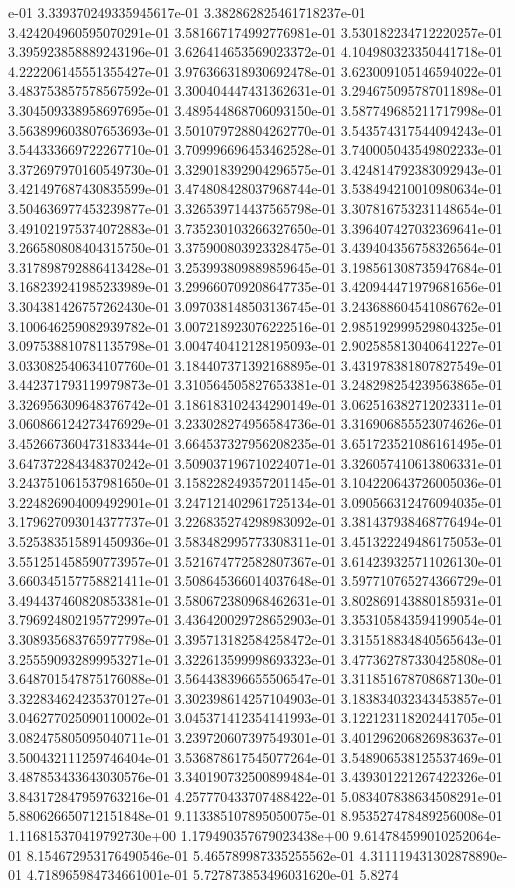e-01	3.339370249335945617e-01	3.382862825461718237e-01	3.424204960595070291e-01	3.581667174992776981e-01	3.530182234712220257e-01	3.395923858889243196e-01	3.626414653569023372e-01	4.104980323350441718e-01	4.222206145551355427e-01	3.976366318930692478e-01	3.623009105146594022e-01	3.483753857578567592e-01	3.300404447431362631e-01	3.294675095787011898e-01	3.304509338958697695e-01	3.489544868706093150e-01	3.587749685211717998e-01	3.563899603807653693e-01	3.501079728804262770e-01	3.543574317544094243e-01	3.544333669722267710e-01	3.709996696453462528e-01	3.740005043549802233e-01	3.372697970160549730e-01	3.329018392904296575e-01	3.424814792383092943e-01	3.421497687430835599e-01	3.474808428037968744e-01	3.538494210010980634e-01	3.504636977453239877e-01	3.326539714437565798e-01	3.307816753231148654e-01	3.491021975374072883e-01	3.735230103266327650e-01	3.396407427032369641e-01	3.266580808404315750e-01	3.375900803923328475e-01	3.439404356758326564e-01	3.317898792886413428e-01	3.253993809889859645e-01	3.198561308735947684e-01	3.168239241985233989e-01	3.299660709208647735e-01	3.420944471979681656e-01	3.304381426757262430e-01	3.097038148503136745e-01	3.243688604541086762e-01	3.100646259082939782e-01	3.007218923076222516e-01	2.985192999529804325e-01	3.097538810781135798e-01	3.004740412128195093e-01	2.902585813040641227e-01	3.033082540634107760e-01	3.184407371392168895e-01	3.431978381807827549e-01	3.442371793119979873e-01	3.310564505827653381e-01	3.248298254239563865e-01	3.326956309648376742e-01	3.186183102434290149e-01	3.062516382712023311e-01	3.060866124273476929e-01	3.233028274956584736e-01	3.316906855523074626e-01	3.452667360473183344e-01	3.664537327956208235e-01	3.651723521086161495e-01	3.647372284348370242e-01	3.509037196710224071e-01	3.326057410613806331e-01	3.243751061537981650e-01	3.158228249357201145e-01	3.104220643726005036e-01	3.224826904009492901e-01	3.247121402961725134e-01	3.090566312476094035e-01	3.179627093014377737e-01	3.226835274298983092e-01	3.381437938468776494e-01	3.525383515891450936e-01	3.583482995773308311e-01	3.451322249486175053e-01	3.551251458590773957e-01	3.521674772582807367e-01	3.614239325711026130e-01	3.660345157758821411e-01	3.508645366014037648e-01	3.597710765274366729e-01	3.494437460820853381e-01	3.580672380968462631e-01	3.802869143880185931e-01	3.796924802195772997e-01	3.436420029728652903e-01	3.353105843594199054e-01	3.308935683765977798e-01	3.395713182584258472e-01	3.315518834840565643e-01	3.255590932899953271e-01	3.322613599998693323e-01	3.477362787330425808e-01	3.648701547875176088e-01	3.564438396655506547e-01	3.311851678708687130e-01	3.322834624235370127e-01	3.302398614257104903e-01	3.183834032343453857e-01	3.046277025090110002e-01	3.045371412354141993e-01	3.122123118202441705e-01	3.082475805095040711e-01	3.239720607397549301e-01	3.401296206826983637e-01	3.500432111259746404e-01	3.536878617545077264e-01	3.548906538125537469e-01	3.487853433643030576e-01	3.340190732500899484e-01	3.439301221267422326e-01	3.843172847959763216e-01	4.257770433707488422e-01	5.083407838634508291e-01	5.880626650712151848e-01	9.113385107895050075e-01	8.953527478489256008e-01	1.116815370419792730e+00	1.179490357679023438e+00	9.614784599010252064e-01	8.154672953176490546e-01	5.465789987335255562e-01	4.311119431302878890e-01	4.718965984734661001e-01	5.727873853496031620e-01	5.8274